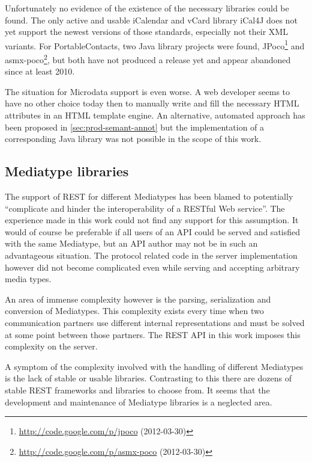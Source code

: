 \documentclass[11pt,a4paper,headsepline,twoside]{scrartcl}		%
\newcommand{\citeurl}[2]{\url{#1} (#2)}
\begin{document}
Unfortunately no evidence of the existence of the necessary libraries could be
found. The only active and usable iCalendar and vCard library iCal4J does not
yet support the newest versions of those standards, especially not their XML
variants. For PortableContacts, two Java library projects were found,
JPoco\footnote{\citeurl{http://code.google.com/p/jpoco}{2012-03-30}} and
asmx-poco\footnote{\citeurl{http://code.google.com/p/asmx-poco}{2012-03-30}},
but both have not produced a release yet and appear abandoned since at least
2010.

The situation for Microdata support is even worse. A web developer seems to have
no other choice today then to manually write and fill the necessary HTML
attributes in an HTML template engine. An alternative, automated approach has
been proposed in \autoref{sec:prod-semant-annot} but the implementation of a
corresponding Java library was not possible in the scope of this work.

\subsection{Mediatype libraries}
\label{sec:mediatype-libraries}

The support of REST for different Mediatypes has been blamed to potentially
``complicate and hinder the interoperability of a RESTful Web
service''\cite[sec. 7.2]{Pautasso:2008:RWS:1367497.1367606}. The experience made
in this work could not find any support for this assumption. It would of course
be preferable if all users of an API could be served and satisfied with the
same Mediatype, but an API author may not be in such an advantageous
situation. The protocol related code in the server implementation however did
not become complicated even while serving and accepting arbitrary media types.

An area of immense complexity however is the parsing, serialization and
conversion of Mediatypes. This complexity exists every time when two
communication partners use different internal representations and must be solved
at some point between those partners. The REST API in this work imposes this
complexity on the server.

A symptom of the complexity involved with the handling of different Mediatypes
is the lack of stable or usable libraries. Contrasting to this there are dozens
of stable REST frameworks and libraries to choose from. It seems that the
development and maintenance of Mediatype libraries is a neglected area.
\end{document}
